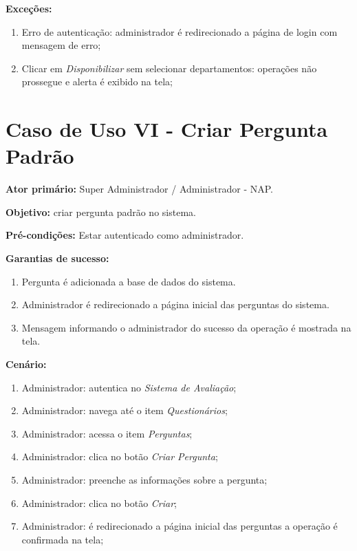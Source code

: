 \documentclass[
  12pt,       %
  openright,      %
  oneside,      %
  a4paper,      %
  english,      %
  french,        %
  spanish,     %
  brazil        %
  ]{abntex2-decsi}
\begin{document}
\begin{apendicesenv}
          \textbf{Exceções:}

              \begin{enumerate}	
                  \item Erro de autenticação: administrador é redirecionado a página de login com mensagem de erro;
                  \item Clicar em \textit{Disponibilizar} sem selecionar departamentos: operações não prossegue e alerta é exibido na tela;
              \end{enumerate}
    
    \newpage
     
	\section{Caso de Uso VI - Criar Pergunta Padrão}
    
	\textbf{Ator primário:} Super Administrador / Administrador - NAP.
				
    \textbf{Objetivo:} criar pergunta padrão no sistema.
    
	\textbf{Pré-condições:} Estar autenticado como administrador.
		
	\textbf{Garantias de sucesso:} 
        
            \begin{enumerate}
            
            \item Pergunta é adicionada a base de dados do sistema.  
            \item Administrador é redirecionado a página inicial das perguntas do sistema.
            \item Mensagem informando o administrador do sucesso da operação é mostrada na tela.
            
            \end{enumerate}
        
		\textbf{Cenário:}
		
		\begin{enumerate}
			\item Administrador: autentica no \textit{Sistema de Avaliação};           
            \item Administrador: navega até o item \textit{Questionários};
			\item Administrador: acessa o item \textit{Perguntas};
			\item Administrador: clica no botão \textit{Criar Pergunta};
			\item Administrador: preenche as informações sobre a pergunta;
			\item Administrador: clica no botão \textit{Criar};
            \item Administrador: é redirecionado a página inicial das perguntas a operação é confirmada na tela;
		\end{enumerate}
		

\end{apendicesenv}
\end{document}
